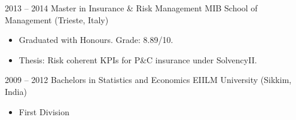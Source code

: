 \documentclass[
	a4paper,
]{fortysecondscv}
\begin{document}
\newpage
\makebacksidebar
		\begin{cvtable}[2]
			\cvitem
				{2013 -- 2014}
				{Master in Insurance \& Risk Management}
				{MIB School of Management (Trieste, Italy)}
				{	
					\begin{itemize}[nosep, leftmargin=0pt, label={}] %
						\item Graduated with Honours. Grade: 8.89/10.
						\item Thesis: Risk coherent KPIs for P\&C insurance under SolvencyII.
					\end{itemize}
				}
			\cvitem
				{2009 -- 2012}
				{Bachelors in Statistics and Economics}
				{EIILM University (Sikkim, India)}
				{
					\vspace{-\topsep}
					\begin{itemize}[nosep, leftmargin=0pt, label={}]
						\item First Division
					\end{itemize}
				}
		\end{cvtable}
\end{document}
